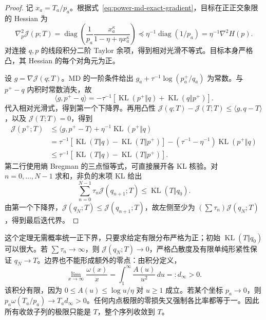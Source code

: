 \documentclass[lang=cn,scheme=chinese,openany]{../book/elegantbook}
\newcommand{\KL}{\operatorname{KL}}
\begin{document}
\begin{proof}
记 $x_a=T_a/p_a$。根据式~\eqref{eq:power-md-exact-gradient}，目标在正正交象限的 Hessian 为
\begin{equation}
 \nabla_p^2\mathcal J(p;T)
 =\operatorname{diag}\left(\frac1{p_a}
       \frac{x_a^\kappa}{1-\eta+\eta x_a^\kappa}\right)
 \preceq\eta^{-1}\operatorname{diag}(1/p_a)
 =\eta^{-1}\nabla^2H(p).
 \label{eq:power-md-hessian-bound}
\end{equation}
对连接 $q,p$ 的线段积分二阶 Taylor 余项，得到相对光滑不等式。目标本身严格凸，其 Hessian 的每个对角元为正。

设 $g=\nabla\mathcal J(q;T)$。MD 的一阶条件给出 $g_a+\tau^{-1}\log(p_a^+/q_a)$ 为常数。与 $p^+-q$ 内积时常数消失，故
\begin{equation}
 \langle g,p^+-q\rangle
 =-\tau^{-1}[\KL(p^+\Vert q)+\KL(q\Vert p^+)].
\end{equation}
代入相对光滑式，得到第一个下降界。再用凸性 $\mathcal J(q;T)-\mathcal J(T;T)\le\langle g,q-T\rangle$，以及 $\mathcal J(T;T)=0$，得到
\begin{align}
 \mathcal J(p^+;T)
 &\le\langle g,p^+-T\rangle+\eta^{-1}\KL(p^+\Vert q)\\
 &=\tau^{-1}[\KL(T\Vert q)-\KL(T\Vert p^+)]
   -(\tau^{-1}-\eta^{-1})\KL(p^+\Vert q)\\
 &\le\tau^{-1}[\KL(T\Vert q)-\KL(T\Vert p^+)].
\end{align}
第二行使用熵 Bregman 的三点恒等式，可直接展开各 KL 核验。对 $n=0,\ldots,N-1$ 求和，非负的末项 KL 给出
\begin{equation}
 \sum_{n=0}^{N-1}\tau_n\mathcal J(q_{n+1};T)\le\KL(T\Vert q_0).
\end{equation}
由第一个下降界，$\mathcal J(q_N;T)\le\mathcal J(q_{n+1};T)$，故左侧至少为 $(\sum\tau_n)\mathcal J(q_N;T)$，得到最后迭代界。
\end{proof}

这个定理无需概率统一正下界，只要求给定有限分布严格为正；初始 $\KL(T\Vert q_0)$ 可以很大。若 $\sum\tau_n\to\infty$，则 $\mathcal J(q_N;T)\to0$，严格凸散度及有限单纯形紧性保证 $q_N\to T$。边界也不能形成额外的零点：由积分定义，
\begin{equation}
 \lim_{x\to\infty}\frac{\omega(x)}x
 =\int_1^\infty\frac{A(u)}{u^2}\,du=:d_\infty>0.
\end{equation}
该积分有限，因为 $0\le A(u)\le\log u/\eta$ 对 $u\ge1$ 成立。若某个坐标 $p_a\to0$，则 $p_a\omega(T_a/p_a)\to T_a d_\infty>0$。任何内点极限的零损失又强制各比率都等于一。因此所有收敛子列的极限只能是 $T$，整个序列收敛到 $T$。
\end{document}
